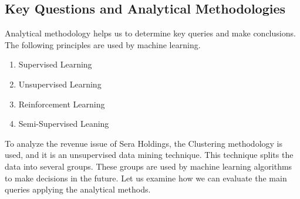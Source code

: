 \documentclass[12pt,a4Paper]{article}
\begin{document}
\subsection{Key Questions and Analytical Methodologies}
Analytical methodology helps us to determine key queries and make conclusions. The following principles are used by machine learning.
\begin{enumerate}
\item Supervised Learning
\item Unsupervised Learning
\item Reinforcement Learning
\item Semi-Supervised Leaning
\end{enumerate}
To analyze the revenue issue of Sera Holdings, the Clustering methodology is used, and it is an unsupervised data mining technique. This technique splits the data into several groups. These groups are used by machine learning algorithms to make decisions in the future. Let us examine how we can evaluate the main queries applying the analytical methods. 
\end{document}
